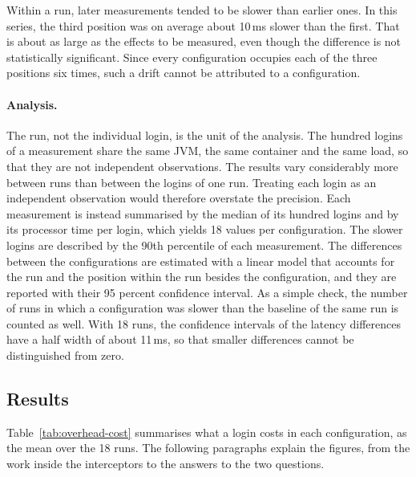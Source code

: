 \documentclass[../main.tex]{subfiles}
\begin{document}
Within a run, later measurements tended to be slower than earlier ones. 
In this series, the third position was on average about 10\,ms slower than the first. 
That is about as large as the effects to be measured, even though the difference is not 
statistically significant. 
Since every configuration occupies each of the three positions six times, such a drift cannot be 
attributed to a configuration. 

\paragraph{Analysis.}
The run, not the individual login, is the unit of the analysis. 
The hundred logins of a measurement share the same JVM, the same container and the same load, so 
that they are not independent observations. 
The results vary considerably more between runs than between the logins of one run. 
Treating each login as an independent observation would therefore overstate the precision. 
Each measurement is instead summarised by the median of its hundred logins and by its processor 
time per login, which yields 18 values per configuration. 
The slower logins are described by the 90th percentile of each measurement. 
The differences between the configurations are estimated with a linear model that accounts for 
the run and the position within the run besides the configuration, and they are reported with their 
95 percent confidence interval. 
As a simple check, the number of runs in which a configuration was slower than the baseline of the 
same run is counted as well. 
With 18 runs, the confidence intervals of the latency differences have a half width of about 
11\,ms, so that smaller differences cannot be distinguished from zero. 

\subsection{Results}\label{subsec:eval-overhead-results}

Table~\ref{tab:overhead-cost} summarises what a login costs in each configuration, as the mean over 
the 18 runs. 
The following paragraphs explain the figures, from the work inside the interceptors to the answers 
to the two questions.
\end{document}
